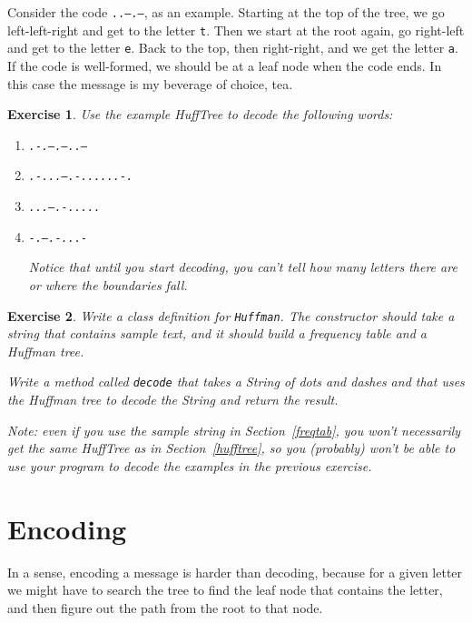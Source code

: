\documentclass[12pt]{book}
\theoremstyle{exercise}
\newtheorem{exercise}{Exercise}[chapter]
\begin{document}
Consider the code {\tt ..--.--}, as an example.  Starting at the
top of the tree, we go left-left-right and get to the letter {\tt t}.
Then we start at the root again, go right-left and get to the
letter {\tt e}.  Back to the top, then right-right, and we get
the letter {\tt a}.  If the code is well-formed, we should be
at a leaf node when the code ends.  In this case the message
is my beverage of choice, tea.

\begin{exercise}
Use the example HuffTree to decode the following words:

\begin{enumerate}

\item {\tt .-.--.--..---}

\item {\tt .-...--.-......-.}

\item {\tt ...--.-.....}

\item {\tt -.--.-...-}

Notice that until you start decoding, you can't tell how many
letters there are or where the boundaries fall.
\end{enumerate}
\end{exercise}


\begin{exercise}
Write a class definition for {\tt Huffman}.  The constructor should
take a string that contains sample text, and it should build a
frequency table and a Huffman tree.

Write a method called {\tt decode} that takes a String of dots
and dashes and that uses the Huffman tree to decode the String
and return the result.

Note: even if you use the sample string in Section~\ref{freqtab},
you won't necessarily get the same HuffTree as in Section~\ref{hufftree},
so you (probably) won't be able to use your program to decode
the examples in the previous exercise.
\end{exercise}


\section{Encoding}
\label{codetab}

In a sense, encoding a message is harder than decoding, because for a
given letter we might have to search the tree to find the leaf node
that contains the letter, and then figure out the path from the root
to that node.
\end{document}
